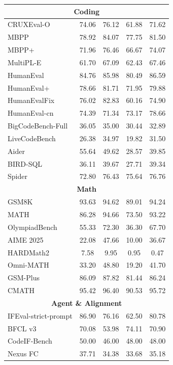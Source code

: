 \begin{table}[htbp]
{\begin{tabular}{lcccc}
\midrule
\multicolumn{5}{c}{\textbf{Coding}} \\
\midrule
CRUXEval-O & 74.06 & 76.12 & 61.88 & 71.62 \\
MBPP & 78.92 & 84.07 & 77.75 & 81.50 \\
MBPP+ & 71.96 & 76.46 & 66.67 & 74.07 \\
MultiPL-E & 61.70 & 67.09 & 62.43 & 67.46 \\
HumanEval & 84.76 & 85.98 & 80.49 & 86.59 \\
HumanEval+ & 78.66 & 81.71 & 71.95 & 79.88 \\
HumanEvalFix & 76.02 & 82.83 & 60.16 & 74.90 \\
HumanEval-cn & 74.39 & 71.34 & 73.17 & 78.66 \\
BigCodeBench-Full & 36.05 & 35.00 & 30.44 & 32.89 \\
LiveCodeBench & 26.38 & 34.97 & 19.82 & 31.50 \\
Aider & 55.64 & 49.62 & 28.57 & 39.85 \\
BIRD-SQL & 36.11 & 39.67 & 27.71 & 39.34 \\
Spider & 72.80 & 76.43 & 75.64 & 76.76 \\
\midrule
\multicolumn{5}{c}{\textbf{Math}} \\
\midrule
GSM8K & 93.63 & 94.62 & 89.01 & 94.24 \\
MATH & 86.28 & 94.66 & 73.50 & 93.22 \\
OlympiadBench & 55.33 & 72.30 & 36.30 & 67.70 \\
AIME 2025 & 22.08 & 47.66 & 10.00 & 36.67 \\
HARDMath2 & 7.58 & 9.95 & 0.95 & 0.47 \\
Omni-MATH & 33.20 & 48.80 & 19.20 & 41.70 \\
GSM-Plus & 86.09 & 87.82 & 81.44 & 86.24 \\
CMATH & 95.42 & 96.40 & 90.53 & 95.72 \\
\midrule
\multicolumn{5}{c}{\textbf{Agent \& Alignment}} \\
\midrule
IFEval-strict-prompt & 86.90 & 76.16 & 62.50 & 80.78 \\
BFCL v3 & 70.08 & 53.98 & 74.11 & 70.90 \\
CodeIF-Bench & 50.00 & 46.00 & 48.00 & 48.00 \\
Nexus FC & 37.71 & 34.38 & 33.68 & 35.18 \\
\bottomrule
\end{tabular}%
} %
\end{table}